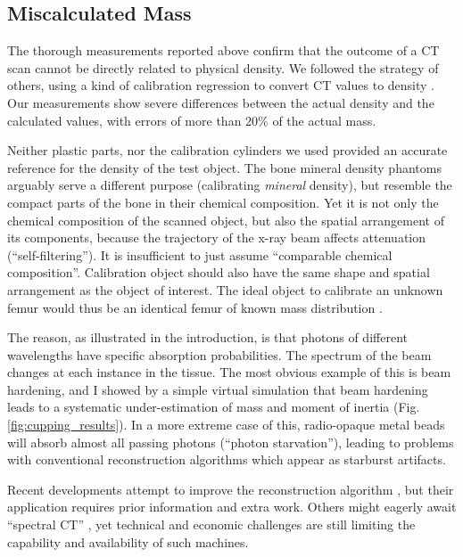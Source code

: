 \subsection{Miscalculated Mass}
\label{sec:orge94cc17}
The thorough measurements reported above confirm that the outcome of a CT scan cannot be directly related to physical density.
We followed the strategy of others, using a kind of calibration regression to convert CT values to density \citep{Mull1984,Phillips1997,DuPlessis2013,Durston2022,Fath2023}.
Our measurements show severe differences between the actual density and the calculated values, with errors of more than \(20\%\) of the actual mass.


Neither plastic parts, nor the calibration cylinders we used provided an accurate reference for the density of the test object.
The bone mineral density phantoms arguably serve a different purpose (calibrating \emph{mineral} density), but resemble the compact parts of the bone in their chemical composition.
Yet it is not only the chemical composition of the scanned object, but also the spatial arrangement of its components, because the trajectory of the x-ray beam affects attenuation (``self-filtering'').
It is insufficient to just assume ``comparable chemical composition''.
Calibration object should also have the same shape and spatial arrangement as the object of interest.
The ideal object to calibrate an unknown femur would thus be an identical femur of known mass distribution \citep[which is actually attempted in clinical tomography, cf.][]{Lennie2021}.


The reason, as illustrated in the introduction, is that photons of different wavelengths have specific absorption probabilities.
The spectrum of the beam changes at each instance in the tissue.
The most obvious example of this is beam hardening, and I showed by a simple virtual simulation that beam hardening leads to a systematic under-estimation of mass and moment of inertia (Fig. \ref{fig:cupping_results}).
In a more extreme case of this, radio-opaque metal beads will absorb almost all passing photons (``photon starvation''), leading to problems with conventional reconstruction algorithms which appear as starburst artifacts.


Recent developments attempt to improve the reconstruction algorithm \citep{Six2019,Frenkel2022,Yang2021,Batenburg2011}, but their application requires prior information and extra work.
Others might eagerly await ``spectral CT'' \citep{Liu2023}, yet technical and economic challenges are still limiting the capability and availability of such machines.


